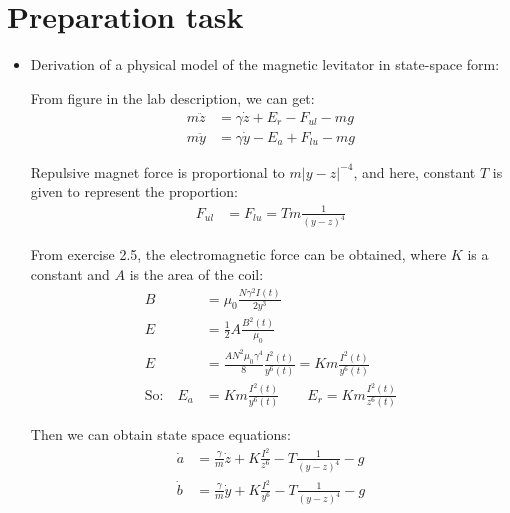 \documentclass[10pt,a4paper]{article}
\begin{document}
\begin{titlepage}

\end{titlepage}
\newpage
\pagestyle{plain}

\section{Preparation task}
\begin{itemize}
    \item Derivation of a physical model of the magnetic levitator in state-space form:
    \par From figure in the lab description, we can get:
	\begin{align}
		m \ddot{z} &= \gamma \dot{z} + E_{r} - F_{ul} - mg \\
		m \ddot{y} &= \gamma \dot{y} - E_{a} + F_{lu} - mg
	\end{align}
	\par Repulsive magnet force is proportional to $m \vert y - z \vert^{-4}$, and here, constant $T$ is given to represent the proportion:
	\begin{align}
		F_{ul} &= F_{lu} = T m \frac{1}{(y - z)^{4}}
	\end{align}
	\par From exercise 2.5, the electromagnetic force can be obtained, where $K$ is a constant and $A$ is the area of the coil:
	\begin{align}
		B &= \mu_{0} \frac{N \gamma^{2} I(t)}{2 y^{3}} \\
		E &= \frac{1}{2} A \frac{B^{2}(t)}{\mu_{0}} \\
		E &= \frac{A N^{2} \mu_{0} \gamma^{4}}{8} \frac{I^{2}(t)}{y^{6}(t)} = K m \frac{I^{2}(t)}{y^{6}(t)} \\
		\text{So:} \quad E_{a} &= K m \frac{I^{2}(t)}{y^{6}(t)} \qquad E_{r} = K m \frac{I^{2}(t)}{z^{6}(t)}
	\end{align}
	\par Then we can obtain state space equations:
	\begin{align}
		\dot{a} &= \frac{\gamma}{m} \dot{z} + K \frac{I^{2}}{z^{6}} - T \frac{1}{(y - z)^{4}} - g \\
		\dot{b} &= \frac{\gamma}{m} \dot{y} + K \frac{I^{2}}{y^{6}} - T \frac{1}{(y - z)^{4}} - g \\

\end{align}
\end{itemize}
\end{document}
